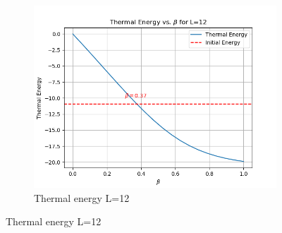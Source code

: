 \documentclass[12pt]{article}
\begin{document}
\begin{figure}[htbp]
\begin{subfigure}[b]{0.32\textwidth}
        \includegraphics[width=\textwidth]{p4_1_2_thermal_energy_L12.png}
        \caption{Thermal energy L=12}
    \end{subfigure}


\end{figure}
\end{document}
